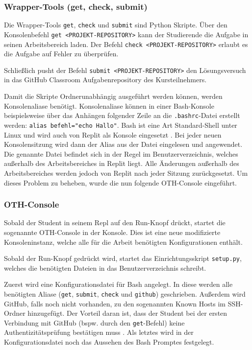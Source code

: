 \subsubsection{Wrapper-Tools (get, check, submit)}
\label{replit-template-wrapper-tools}
Die Wrapper-Tools \texttt{get}, \texttt{check} und \texttt{submit} sind Python
Skripte. Über den Konsolenbefehl \texttt{get <PROJEKT-REPOSITORY>} kann der
Studierende die Aufgabe in seinen Arbeitsbereich laden. Der Befehl 
\texttt{check <PROJEKT-REPOSITORY>} erlaubt es die Aufgabe auf Fehler zu
überprüfen.

Schließlich pusht der Befehl \texttt{submit <PROJEKT-REPOSITORY>}
den Lösungsversuch in das GitHub Classroom Aufgabenrepository des
Kursteilnehmers.

Damit die Skripte Ordnerunabhängig ausgeführt werden können, werden
Konsolenaliase benötigt. Konsolenaliase können in einer Bash-Konsole
beispielsweise über das Anhängen folgender Zeile an die \texttt{.bashrc}-Datei
erstellt werden: \texttt{alias befehl="echo Hallo"}. Bash ist eine Art
\glqq Standard-Shell\grqq{} unter Linux und wird auch von Replit als Konsole
eingesetzt \parencite{bash}. Bei jeder neuen Konsolensitzung wird dann der Alias aus
der Datei eingelesen und angewendet. Die genannte Datei befindet sich in der
Regel im Benutzerverzeichnis, welches außerhalb des Arbeitsbereiches in Replit
liegt. Alle Änderungen außerhalb des Arbeitsbereiches werden jedoch von Replit
nach jeder Sitzung zurückgesetzt. Um dieses Problem zu beheben, wurde die nun
folgende OTH-Console eingeführt.

\subsubsection{OTH-Console}\label{replit-template-oth-console}
Sobald der Student in seinem Repl auf den Run-Knopf drückt, startet die
sogenannte OTH-Console in der Konsole. Dies ist eine neue
modifizierte Konsoleninstanz, welche alle für die Arbeit benötigten
Konfigurationen enthält.

Sobald der Run-Knopf gedrückt wird, startet das Einrichtungsskript
\texttt{setup.py}, welches die benötigten Dateien in das Benutzerverzeichnis
schreibt.

Zuerst wird eine Konfigurationsdatei für Bash angelegt. In diese
werden alle benötigten Aliase (\texttt{get}, \texttt{submit}, \texttt{check}
und \texttt{github}) geschrieben. Außerdem wird GitHub, falls noch
nicht vorhanden, zu den sogenannten \glqq Known Hosts\grqq{} im SSH-Ordner
hinzugefügt. Der Vorteil daran ist, dass der Student bei der ersten Verbindung
mit GitHub (bspw. durch den \texttt{get}-Befehl) keine Authentizitätsprüfung
bestätigen muss \parencite{ssh}. Als letztes wird in der Konfigurationsdatei noch das
Aussehen des Bash Promptes festgelegt.

